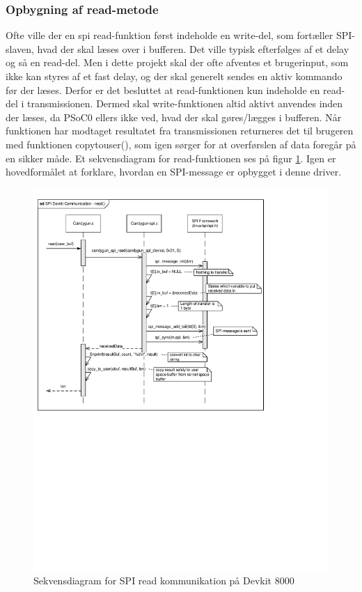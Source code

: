 \subsubsection{Opbygning af read-metode} 
Ofte ville der en spi read-funktion først indeholde en write-del, som fortæller SPI-slaven, hvad der skal læses over i bufferen. Det ville typisk efterfølges af et delay og så en read-del. Men i dette projekt skal der ofte afventes et brugerinput, som ikke kan styres af et fast delay, og der skal generelt sendes en aktiv kommando før der læses. Derfor er det besluttet at read-funktionen kun indeholde en read-del i transmissionen. Dermed skal write-funktionen altid aktivt anvendes inden der læses, da PSoC0 ellers ikke ved, hvad der skal gøres/lægges i bufferen.
Når funktionen har modtaget resultatet fra transmissionen returneres det til brugeren med funktionen copy\textunderscore to\textunderscore user(), som igen sørger for at overførslen af data foregår på en sikker måde.
Et sekvensdiagram for read-funktionen ses på figur \ref{fig:spiread}. Igen er hovedformålet at forklare, hvordan en SPI-message er opbygget i denne driver.\\

 \begin{figure}[H]
 	\centering 
 	\includegraphics[width=1.25\textwidth, trim = {0 11.6cm 0 0}]{Afsnit/DesignOgImplementering/images/SPIsekvensRead}
 	\caption{Sekvensdiagram for SPI read kommunikation på Devkit 8000}
 	\label{fig:spiread}
 \end{figure}

